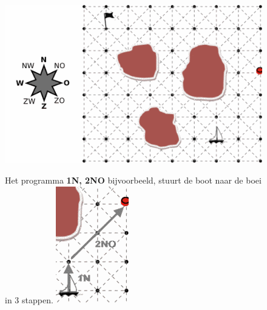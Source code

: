 \documentclass[12pt]{article}
\begin{document}
\begin{minipage}{\textwidth}
			\begin{figure}[H]
				\begin{minipage}{0.7\linewidth}
					\includegraphics[width=\linewidth]{image1}
				\end{minipage}
				\hfill
				\begin{minipage}{0.25\linewidth}
					\centering
					Het programma \textbf{1N, 2NO} bijvoorbeeld, stuurt de boot
					naar de boei in 3 stappen.
					\includegraphics[width=0.9\linewidth]{image2}
				\end{minipage}
			\end{figure}
	

\end{minipage}
\end{document}

